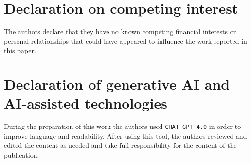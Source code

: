 \documentclass[12pt]{article}
\begin{document}
\section*{Declaration on competing interest}

\noindent The authors declare that they have no known competing financial interests or personal relationships that could have appeared to influence the work reported in this paper.

\section*{Declaration of generative AI and AI-assisted technologies}

\noindent During the preparation of this work the authors used \texttt{CHAT-GPT 4.0} in order to improve language and readability. After using this tool, the authors reviewed and edited the content as needed and take full responsibility for the content of the publication.
\end{document}
